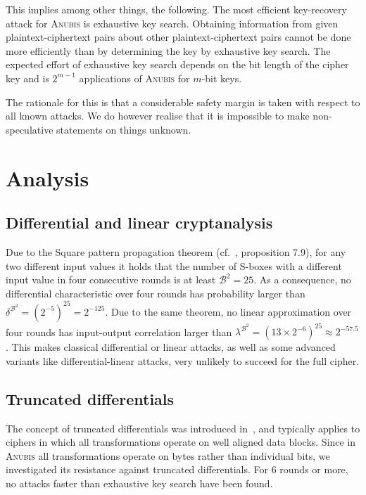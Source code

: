 \documentclass{llncs}
\newcommand{\B}{\mathcal{B}}
\begin{document}
This implies among other things, the following. The most
efficient key-recovery attack for \textsc{Anubis} is exhaustive
key search. Obtaining information from given plaintext-ciphertext
pairs about other plaintext-ciphertext pairs cannot be done more
efficiently than by determining the key by exhaustive key search.
The expected effort of exhaustive key search depends on the bit
length of the cipher key and is $2^{m-1}$ applications of
\textsc{Anubis} for $m$-bit keys.

The rationale for this is that a considerable safety margin is
taken with respect to all known attacks. We do however realise
that it is impossible to make non-speculative statements on things
unknown.

\section{Analysis}\label{analysis}

\subsection{Differential and linear cryptanalysis}

Due to the Square pattern propagation theorem (cf.~\cite{vincent},
proposition 7.9), for any two different input values it holds that the
number of S-boxes with a different input value in four consecutive
rounds is at least  $\B^2 = 25$. As a consequence, no differential
characteristic over four rounds has probability larger than
$\delta^{\B^2} = (2^{-5})^{25} = 2^{-125}$. Due to the same theorem,
no linear approximation over four rounds has input-output correlation
larger than $\lambda^{\B^2} = (13 \times 2^{-6})^{25} \approx 2^{-57.5}$.
This makes classical
differential or linear attacks, as well as some advanced variants
like differential-linear attacks, very unlikely to succeed for the
full cipher.

\subsection{Truncated differentials}

The concept of truncated differentials was introduced
in~\cite{knudsen-trunc}, and typically applies to ciphers in
which all transformations operate on well aligned data blocks.
Since in \textsc{Anubis} all transformations operate on bytes
rather than individual bits, we investigated its resistance
against truncated differentials. For 6 rounds or more, no attacks
faster than exhaustive key search have been found.
\end{document}
